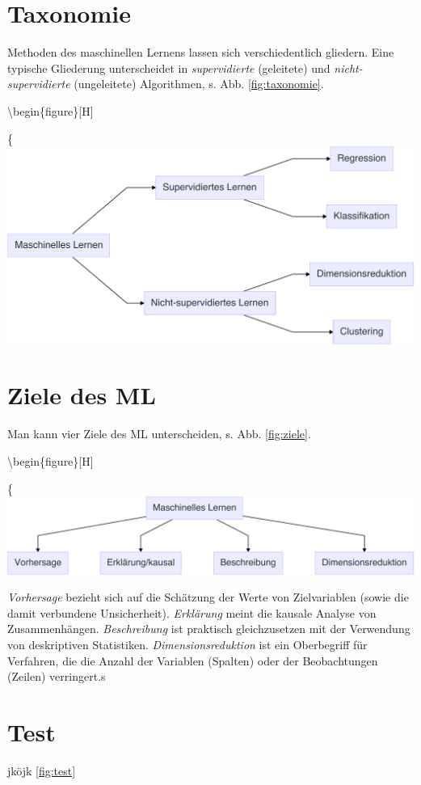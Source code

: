 \documentclass[
]{book}
\begin{document}
\hypertarget{taxonomie}{%
\section{Taxonomie}\label{taxonomie}}

Methoden des maschinellen Lernens lassen sich verschiedentlich gliedern.
Eine typische Gliederung unterscheidet in \emph{supervidierte} (geleitete) und \emph{nicht-supervidierte} (ungeleitete) Algorithmen, s. Abb. \ref{fig:taxonomie}.

\textbackslash begin\{figure\}{[}H{]}

\{\centering \includegraphics[width=0.5\linewidth]{chunk-img/taxonomie-1}

\hypertarget{ziele-des-ml}{%
\section{Ziele des ML}\label{ziele-des-ml}}

Man kann vier Ziele des ML unterscheiden, s. Abb. \ref{fig:ziele}.

\textbackslash begin\{figure\}{[}H{]}

\{\centering \includegraphics[width=0.5\linewidth]{chunk-img/ziele-1}

\emph{Vorhersage} bezieht sich auf die Schätzung der Werte von Zielvariablen (sowie die damit verbundene Unsicherheit).
\emph{Erklärung} meint die kausale Analyse von Zusammenhängen.
\emph{Beschreibung} ist praktisch gleichzusetzen mit der Verwendung von deskriptiven Statistiken.
\emph{Dimensionsreduktion} ist ein Oberbegriff für Verfahren, die die Anzahl der Variablen (Spalten) oder der Beobachtungen (Zeilen) verringert.s

\hypertarget{test}{%
\section{Test}\label{test}}

jköjk \ref{fig:test}
\end{document}
